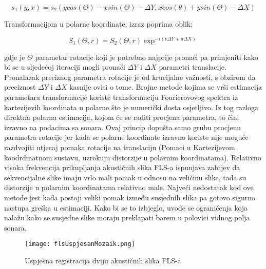\documentclass[times, utf8, diplomski]{fer}
\begin{document}
$$ s_1(y,x) = s_2(y cos(\Theta)-x sin(\Theta)-\Delta Y,x cos(\theta)+y sin(\Theta)-\Delta X) $$

Transformacijom u polarne koordinate, izraz poprima oblik;

$$ S_1(\Theta,r) = S_2(\Theta,r) \exp^{-i(v \Delta Y + u \Delta X)} $$


gdje je $\Theta$ parametar rotacije koji je potrebno najprije pronaći pa primjeniti kako bi se u sljedećoj iteraciji mogli pronaći $\Delta Y$ i $\Delta X$ parametri translacije. Pronalazak preciznog parametra rotacije je od krucijalne važnosti, s obzirom da preciznost $\Delta Y$ i $\Delta X$ kasnije ovisi o tome. Brojne metode kojima se vrši estimacija parametara transformacije koriste transformaciju Fourierovovog spektra iz kartezijevih koordinata u polarne što je numerički dosta osjetljivo. Iz tog razloga direktna polarna estimacija, kojom će se raditi procjena parametra, to čini izravno na podacima sa sonara. Ovaj princip  dopušta samo grubu procjenu parametra rotacije jer kada se polarne koordinate izravno koriste nije moguće razdvojiti utjecaj pomaka rotacije na translaciju (Pomaci u Kartezijevom koodrdinatnom sustavu, uzrokuju distorzije u polarnim koordinatama). Relativno visoka frekvencija prikupljanja akustičnih slika FLS-a ispunjava zahtjev da sekvencijalne slike imaju vrlo mali pomak u odnosu na veličinu slike, tada su distorzije u polarnim koordinatama relativno male. Najveći nedostatak kod ove metode jest kada postoji veliki pomak između susjednih slika pa gotovo sigurno nastupa greška u estimaciji. Kako bi se to izbjeglo, uvode se ograničenja koja nalažu kako se susjedne slike moraju preklapati barem u polovici vidnog polja sonara. 
\begin{figure}[htb]
\centering
\texttt{[image: flsUspjesanMozaik.png]}
		\caption{Uspješna registracija dviju akustičnih slika FLS-a}
		\label{fig:Uspješna registracija dviju akustičnih slika FLS-a}
\end{figure}
\end{document}

